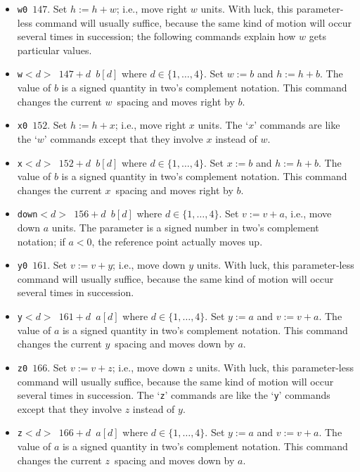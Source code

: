 \documentclass[10pt, a4paper, english]{article}
\begin{document}
\begin{itemize}
\item[147] \texttt{w0 $147$}. 
Set $h:=h+w$; i.e., move right $w$ units. With luck,
this parameter-less command will usually suffice, because the same kind of motion
will occur several times in succession; the following commands explain how
$w$ gets particular values. 

\item[148--151] \texttt{w$<d>$ $147+d$ $b[d]$} where $d\in\{1,\dots,4\}$. 
Set $w:=b$ and $h:=h+b$. 
The value of $b$ is a signed quantity in two's complement notation. 
This command changes the current $w$~spacing and moves right by $b$.


\item[152] \texttt{x0 $152$}. 
Set $h:=h+x$; i.e., move right $x$ units. The `$x$'
commands are like the `$w$' commands except that they involve $x$ instead
of $w$.

\item[153--156] \texttt{x$<d>$ $152+d$ $b[d]$} where $d\in\{1,\dots,4\}$. 
Set $x:=b$ and $h:=h+b$. 
The value of $b$ is a signed quantity in two's complement notation. 
This command changes the current $x$~spacing and moves right by $b$.


\item[159] \texttt{down$<d>$ $156+d$ $b[d]$} where $d\in\{1,\dots,4\}$. 
Set $v:=v+a$, i.e., move down $a$ units. 
The parameter is a signed number in two's complement notation; 
if $a<0$, the reference point actually moves up.


\item[161] \texttt{y0 $161$}. 
Set $v:=v+y$; i.e., move down $y$ units. 
With luck, this parameter-less command will usually suffice, 
because the same kind of motion will occur several times in succession.

\item[162--165] \texttt{y$<d>$ $161+d$ $a[d]$} where $d\in\{1,\dots,4\}$. 
Set $y:=a$ and $v:=v+a$. 
The value of $a$ is a signed quantity in two's complement notation. 
This command changes the current $y$~spacing and moves down by $a$. 

\item[166] \texttt{z0 $166$}. 
Set $v:=v+z$; i.e., move down $z$ units. 
With luck, this parameter-less command will usually suffice, 
because the same kind of motion will occur several times in succession.
The `\texttt{z}' commands are like the `\texttt{y}' commands 
except that they involve $z$ instead of $y$. 

\item[167--170] \texttt{z$<d>$ $166+d$ $a[d]$} where $d\in\{1,\dots,4\}$. 
Set $y:=a$ and $v:=v+a$. 
The value of $a$ is a signed quantity in two's complement notation. 
This command changes the current $z$~spacing and moves down by $a$. 



\end{itemize}
\end{document}

